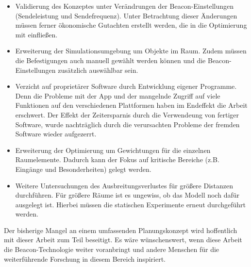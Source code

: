 \begin{itemize}
\item Validierung des Konzeptes unter Verändrungen der Beacon-Einstellungen (Sendeleistung und Sendefrequenz). Unter Betrachtung dieser Änderungen müssen ferner ökonomische Gutachten erstellt werden, die in die Optimierung mit einfließen.
\item  Erweiterung der Simulationsumgebung um Objekte im Raum. Zudem müssen die Befestigungen auch manuell gewählt werden können und die Beacon-Einstellungen zusätzlich auswählbar sein.
\item Verzicht auf proprietärer Software durch Entwicklung eigener Programme. Denn die Probleme mit der App und der mangelnde Zugriff auf viele Funktionen auf den verschiedenen Plattformen haben im Endeffekt die Arbeit erschwert. Der Effekt der Zeitersparnis durch die Verwendeung von fertiger Software, wurde nachträglich durch die verursachten Probleme der fremden Software wieder aufgezerrt. 
\item Erweiterung der Optimierung um Gewichtungen für die einzelnen Raumelemente. Dadurch kann der Fokus auf kritische Bereiche (z.B. Eingänge und Besonderheiten) gelegt werden. 
\item Weitere Untersuchungen des Ausbreitungsverlustes für größere Distanzen durchführen. Für größere Räume ist es ungewiss, ob das Modell noch dafür ausgelegt ist. Hierbei müssen die statischen Experimente erneut durchgeführt werden.
\end{itemize}
Der bisherige Mangel an einem umfassenden Planungskonzept wird hoffentlich mit dieser Arbeit zum Teil beseitigt. Es wäre wünschenswert, wenn diese Arbeit die Beacon-Technologie weiter voranbringt und andere Menschen für die weiterführende Forschung in diesem Bereich inspiriert.